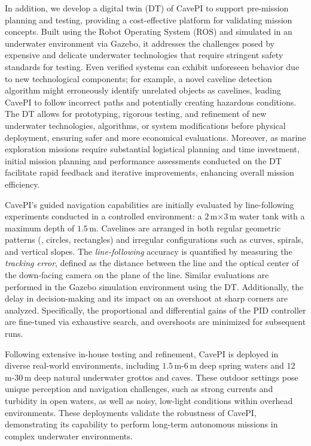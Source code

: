 In addition, we develop a digital twin (DT) of CavePI to support pre-mission planning and testing, providing a cost-effective platform for validating mission concepts. Built using the Robot Operating System (ROS) and simulated in an underwater environment via Gazebo, it addresses the challenges posed by expensive and delicate underwater technologies that require stringent safety standards for testing. Even verified systems can exhibit unforeseen behavior due to new technological components; for example, a novel caveline detection algorithm might erroneously identify unrelated objects as cavelines, leading CavePI to follow incorrect paths and potentially creating hazardous conditions. The DT allows for prototyping, rigorous testing, and refinement of new underwater technologies, algorithms, or system modifications before physical deployment, ensuring safer and more economical evaluations. Moreover, as marine exploration missions require substantial logistical planning and time investment, initial mission planning and performance assessments conducted on the DT facilitate rapid feedback and iterative improvements, enhancing overall mission efficiency.



CavePI's guided navigation capabilities are initially evaluated by line-following experiments conducted in a controlled environment: a $2$\,m$\times3$\,m water tank with a maximum depth of $1.5$\,m. Cavelines are arranged in both regular geometric patterns (\eg, circles, rectangles) and irregular configurations such as curves, spirals, and vertical slopes. The \textit{line-following} accuracy is quantified by measuring the \textit{tracking error}, defined as the distance between the line and the optical center of the down-facing camera on the plane of the line. Similar evaluations are performed in the Gazebo simulation environment using the DT. Additionally, the delay in decision-making and its impact on an overshoot at sharp corners are analyzed. Specifically, the proportional and differential gains of the PID controller are fine-tuned via exhaustive search, and overshoots are minimized for subsequent runs. 

Following extensive in-house testing and refinement, CavePI is deployed in diverse real-world environments, including $1.5$\,m-$6$\,m %
 deep spring waters and $12$\,m-$30$\,m %
deep natural underwater grottos and caves. These outdoor settings pose unique perception and navigation challenges, such as strong currents and turbidity in open waters, as well as noisy, low-light conditions within overhead environments. These deployments validate the robustness of CavePI, demonstrating its capability to perform long-term autonomous missions in complex underwater environments.

